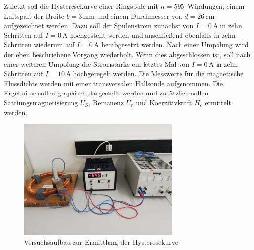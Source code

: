 Zuletzt soll die Hysteresekurve einer Ringspule mit $n = 595\,$ Windungen, einem Luftspalt der 
Breite $b = 3\, \si{\milli\meter}$ und einem Durchmesser von $d = 26\, \si{\centi\meter}$ aufgezeichnet werden. Dazu
soll der Spulenstrom zunächst von $I = 0\, \si{\ampere}$ in zehn Schritten auf $I = 0\, \si{\ampere}$ hochgestellt werden 
und anschließend ebenfalls in zehn Schritten wiederum auf $I = 0\, \si{\ampere}$ herabgesetzt werden. Nach einer Umpolung 
wird der eben beschriebene Vorgang wiederholt. Wenn dies abgeschlossen ist, soll nach einer weiteren Umpolung die Stromstärke
ein letztes Mal von $I = 0\, \si{\ampere}$ in zehn Schritten auf $I = 10\, \si{\ampere}$ hochgeregelt werden. Die 
Messwerte für die magnetische Flussdichte werden mit einer transversalen Hallsonde aufgenommen. Die Ergebnisse sollen 
graphisch dargestellt werden und zusätzlich sollen Sättiungsmagnetisierung $U_S$, Remanenz $U_r$ und 
Koerzitivkraft $H_c$ ermittelt werden.

\begin{figure}[H]
    \centering
    \includegraphics{content/Ringspule.jpg}
    \caption{Versuchsaufbau zur Ermittlung der Hysteresekurve}
    \label{Ringspule}
\end{figure}